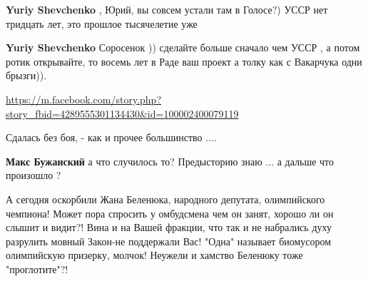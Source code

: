 \begin{itemize}
\begin{itemize}
\textbf{Yuriy Shevchenko} , Юрий, вы совсем устали там в Голосе?) УССР нет тридцать лет, это прошлое тысячелетие уже

 
\textbf{Yuriy Shevchenko} Соросенок )) сделайте больше сначало чем УССР , а потом ротик открывайте, то восемь лет в Раде ваш проект а толку как с Вакарчука одни брызги)).
\end{itemize}

 
\url{https://m.facebook.com/story.php?story_fbid=4289555301134430&id=100002400079119}

 
Сдалась без боя, - как и прочее большинство ....

 
\textbf{Макс Бужанский} а что случилось то? Предысторию знаю ... а дальше что произошло ?

 

А сегодня оскорбили Жана Беленюка, народного депутата, олимпийского чемпиона!
Может пора спросить у омбудсмена чем он занят, хорошо ли он слышит и видит?!
Вина и на Вашей фракции, что так и не набрались духу разрулить мовный Закон-не
поддержали Вас! "Одна" называет биомусором олимпийскую призерку, молчок!
Неужели и хамство Беленюку тоже "проглотите"?!


\end{itemize}
